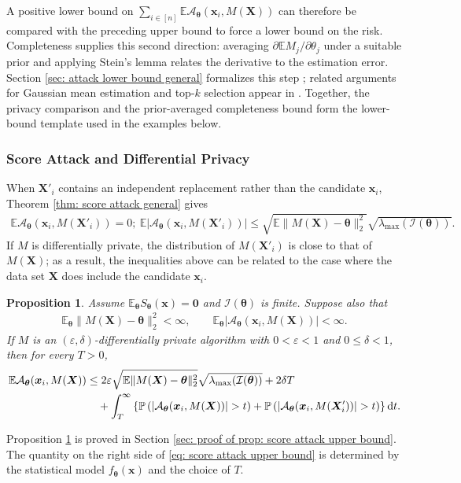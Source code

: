 \documentclass[letterpaper,12pt]{article}
\renewcommand{\d}{\mathrm{d}}
\numberwithin{equation}{section}
\theoremstyle{plain}
\numberwithin{Theorem}{section}
\newtheorem{proposition}{Proposition}
\numberwithin{proposition}{section}
\numberwithin{Lemma}{section}
{
	\theoremstyle{definition}
	\newtheorem{Definition}{Definition}
	\newtheorem{example}{Example}
	\numberwithin{example}{section}
	\newtheorem{fact}{Fact}
	\numberwithin{fact}{section}
	\newtheorem{remark}{Remark}
}
\newcommand{\A}{\mathcal{A}}
\newcommand{\Pro}{\mathbb{P}}
\newcommand{\1}{\mathbbm{1}}
\def\bth{{\boldsymbol{\theta}}}
\def\E{\mathbb{E}}
\begin{document}
A positive lower bound on $\sum_{i \in [n]} \E \A_\bth (\bm x_i, M(\bm X))$ can therefore be compared with the preceding upper bound to force a lower bound on the risk. Completeness supplies this second direction: averaging $\partial\E M_j/\partial\theta_j$ under a suitable prior and applying Stein's lemma relates the derivative to the estimation error. Section \ref{sec: attack lower bound general} formalizes this step \cite{stein1972bound, stein2004use}; related arguments for Gaussian mean estimation and top-$k$ selection appear in \citep{dwork2015robust, steinke2017between}. Together, the privacy comparison and the prior-averaged completeness bound form the lower-bound template used in the examples below.

\subsubsection{Score Attack and Differential Privacy}\label{sec: attack upper bound general}
When $\bm X'_i$ contains an independent replacement rather than the candidate $\bm x_i$, Theorem \ref{thm: score attack general} gives
\begin{align*}
	\E \A_\bth(\bm x_i, M(\bm X'_i)) = 0; ~ \E |\A_\bth(\bm x_i, M(\bm X'_i))| \leq \sqrt{\E\|M(\bm X) - \bth\|_2^2}\sqrt{\lambda_{\max}(\mathcal I(\bth))}.
\end{align*}
If $M$ is differentially private, the distribution of $M(\bm X'_i)$ is close to that of $M(\bm X)$; as a result, the inequalities above can be related to the case where the data set $\bm X$ does include the candidate $\bm x_i$.
\begin{proposition}\label{prop: score attack upper bound}
			Assume $\E_\bth S_\bth(\bm x)=\bm0$ and $\mathcal I(\bth)$ is finite. Suppose also that
			\begin{align*}
				\E_\bth\|M(\bm X)-\bth\|_2^2<\infty,
				\qquad
				\E_\bth|\A_\bth(\bm x_i,M(\bm X))|<\infty.
			\end{align*}
			If $M$ is an $(\varepsilon, \delta)$-differentially private algorithm with $0 < \varepsilon < 1$ and $0\leq\delta<1$, then for every $T > 0$, 
	\begin{align}\label{eq: score attack upper bound}
		\E \A_\bth(\bm x_i, M(\bm X))
		&\leq 2\varepsilon \sqrt{\E\|M(\bm X) - \bth\|_2^2}
		\sqrt{\lambda_{\max}(\mathcal I(\bth))} + 2\delta T \notag\\
			&\quad + \int_T^\infty \left\{\Pro\left(|\A_\bth(\bm x_i, M(\bm X))| > t \right)
			+\Pro\left(|\A_\bth(\bm x_i, M(\bm X_i'))| > t \right)\right\} \d t.
	\end{align}
\end{proposition}
Proposition \ref{prop: score attack upper bound} is proved in Section \ref{sec: proof of prop: score attack upper bound}. The quantity on the right side of \eqref{eq: score attack upper bound} is determined by the statistical model $f_\bth(\bm x)$ and the choice of $T$.
\end{document}
